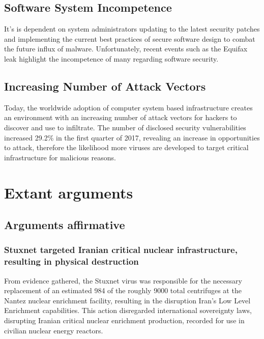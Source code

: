 \documentclass[12pt]{article}
\begin{document}
\begin{multicols}{2}
\subsection{Software System Incompetence}

It's is dependent on system administrators updating to the latest security patches and implementing the current best practices of secure software design to combat the future influx of malware. Unfortunately, recent events such as the Equifax leak highlight the incompetence of many regarding software security.\cite{equifaxHack}

\subsection{Increasing Number of Attack Vectors}

Today, the worldwide adoption of computer system based infrastructure creates an environment with an increasing number of attack vectors for hackers to discover and use to infiltrate. The number of disclosed security vulnerabilities increased 29.2\% in the first quarter of 2017, revealing an increase in opportunities to attack, therefore the likelihood more viruses are developed to target critical infrastructure for malicious reasons.\cite{industrialCyberVulnerabilities}

\section{Extant arguments}

\subsection{Arguments affirmative}

\subsubsection{Stuxnet targeted Iranian critical nuclear infrastructure, resulting in physical destruction}

From evidence gathered, the Stuxnet virus was responsible for the necessary replacement of an estimated 984 of the roughly 9000 total centrifuges at the Nantez nuclear enrichment facility, resulting in the disruption Iran's Low Level Enrichment capabilities.\cite{lookIntoIranianNuclearProgram} This action disregarded international sovereignty laws, disrupting Iranian critical nuclear enrichment production, recorded for use in civilian nuclear energy reactors.\cite{internationalSovereigntyDefinition}\footnotemark[2] 



\end{multicols}
\end{document}
